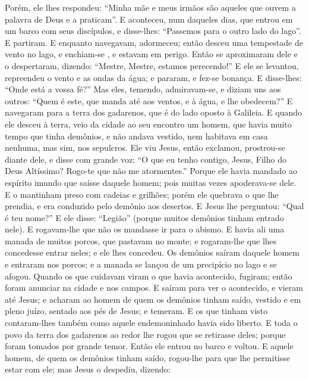 {  Porém, ele lhes respondeu: “Minha mãe e meus irmãos são aqueles que ouvem a palavra de Deus e a praticam”.
  E aconteceu, num daqueles dias, que
{} entrou em um barco com seus discípulos, e disse-lhes: “Passemos para o outro lado do lago”. E partiram.
  E enquanto navegavam,
{} adormeceu; então desceu uma tempestade de vento no lago, e enchiam-se
{},  e estavam em perigo.
  Então se aproximaram dele e o despertaram, dizendo: “Mestre, Mestre, estamos perecendo!” E ele se levantou, repreendeu o vento e as ondas da água; e pararam, e fez-se bonança.
  E disse-lhes: “Onde está a vossa fé?” Mas eles, temendo, admiravam-se, e diziam uns aos outros: “Quem é este, que manda até aos ventos, e à água, e lhe obedecem?”
  E navegaram para a terra dos gadarenos, que é do lado oposto à Galileia.
  E quando ele desceu à terra, veio da cidade ao seu encontro um homem, que havia muito tempo que tinha demônios, e não andava vestido, nem habitava em casa nenhuma, mas sim, nos sepulcros.
  Ele viu Jesus, então exclamou, prostrou-se diante dele, e disse com grande voz: “O que eu tenho contigo, Jesus, Filho do Deus Altíssimo? Rogo-te que não me atormentes.”
  Porque ele havia mandado ao espírito imundo que saísse daquele homem; pois muitas vezes apoderava-se dele. E o mantinham preso com cadeias e grilhões; porém ele quebrava o que lhe prendia, e era conduzido pelo demônio aos desertos.
  E Jesus lhe perguntou: “Qual é teu nome?” E ele disse: “Legião” (porque muitos demônios tinham entrado nele).
  E rogavam-lhe que não os mandasse ir para o abismo.
  E havia ali uma manada de muitos porcos, que pastavam no monte; e rogaram-lhe que lhes concedesse entrar neles; e ele lhes concedeu.
  Os demônios saíram daquele homem e entraram nos porcos; e a manada se lançou de um precipício no lago e se afogou.
  Quando os que cuidavam
{} viram o que havia acontecido, fugiram; então foram anunciar na cidade e nos campos.
  E saíram para ver o acontecido, e vieram até Jesus; e acharam ao homem de quem os demônios tinham saído, vestido e em pleno juízo, sentado aos pés de Jesus; e temeram.
  E os que tinham visto contaram-lhes também como aquele endemoninhado havia sido liberto.
  E toda o povo da terra dos gadarenos ao redor lhe rogou que se retirasse deles; porque foram tomados por grande temor. Então ele entrou no barco e voltou.
  E aquele homem, de quem os demônios tinham saído, rogou-lhe para que lhe permitisse estar com ele; mas Jesus o despediu, dizendo:
}
